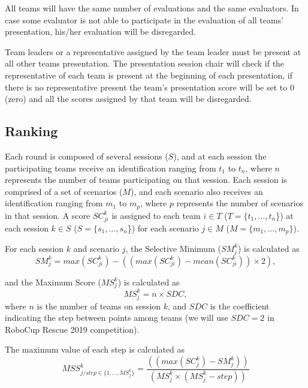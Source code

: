 \documentclass{article}
\begin{document}
All teams will have the same number of evaluations and the same evaluators. In case some evaluator is not able to participate in the evaluation of all teams' presentation, his/her evaluation will be disregarded.

Team leaders or a representative assigned by the team leader must be present at all other teams presentation. The presentation session chair will check if the representative of each team is present at the beginning of each presentation, if there is no representative present the team's presentation score will be set to 0 (zero) and all the scores assigned by that team will be disregarded.
\subsection{Ranking}
\label{subsec:ranking}
Each round is composed of several sessions ($S$), and at each session the participating teams receive an identification ranging from $t_{1}$ to $t_{n}$, where $n$ represents the number of teams participating on that session. Each session is comprised of a set of scenarios ($M$), and each scenario also receives an identification ranging from $m_{1}$ to $m_{p}$, where $p$ represents the number of scenarios in that session. A score $SC_{ji}^{k}$ is assigned to each team $i \in T$ ($T = \{t_{1},\dots,t_{n}$\}) at each session $k \in S$ ($S = \{s_{1},\dots,s_{n}$\}) for each scenario $j \in M$ ($M = \{m_{1},\dots,m_{p}\}$).

For each session $k$ and scenario $j$, the Selective Minimum ($SM_{j}^{k}$) is calculated as
\begin{equation}
SM_{j}^{k} = max\left(SC_{ji}^{k}\right) - \left( \left( max \left( SC_{ji}^{k} \right) - mean \left( SC_{ji}^{k} \right)\right) \times 2 \right),
\end{equation}

and the Maximum Score ($MS_{j}^{k}$) is calculated as
\begin{equation}
MS_{j}^{k} = n \times SDC,
\end{equation}
\noindent where $n$ is the number of teams on session $k$, and $SDC$ is the coefficient indicating the step between points among teams (we will use $SDC = 2$ in RoboCup Rescue 2019 competition).

The maximum value of each step is calculated as
\begin{equation}
MSS_{j/step \in \{1,\dots,MS_{j}^{k}\}}^{k} = \frac{\left( \left( max \left( SC_{j}^{k} \right) - SM_{j}^{k} \right) \right)}{\left( MS_{j}^{k} \times \left( MS_{j}^{k} - step \right) \right)}
\end{equation}
\end{document}
